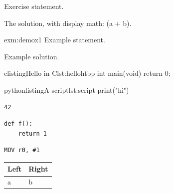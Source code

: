 \begin{exercise}[ID=e1,hash=e1]
\label{exe:one}\label{e1}
Exercise statement.
\end{exercise}
\begin{solution}
The solution, with display math: (a + b).
\end{solution}

\begin{myexample}[]{exm:demo}{x1}
\noindent Example statement.

\tcblower
Example solution.
\end{myexample}

\begin{listingsboxfloat}{clisting}{Hello in C}{lst:hello}{htbp}
int main(void) { return 0; }
\end{listingsboxfloat}

\begin{listingsbox}{pythonlisting}{A script}{lst:script}
print("hi")
\end{listingsbox}

\begin{formattedoutput}
\begin{mintedwrapper}\nointerlineskip\nointerlineskip\begin{verbatim}
42
\end{verbatim}
\end{mintedwrapper}

\end{formattedoutput}

\begin{mintedwrapper}\nointerlineskip\nointerlineskip\begin{verbatim}
def f():
    return 1
\end{verbatim}
\end{mintedwrapper}

\begin{mintedwrapper}\nointerlineskip\nointerlineskip\begin{verbatim}
MOV r0, #1
\end{verbatim}
\end{mintedwrapper}

\begin{table}
\begin{tabular}{ll}
\toprule
Left & Right \\
\midrule
a & b \\
\bottomrule
\end{tabular}
\end{table}

